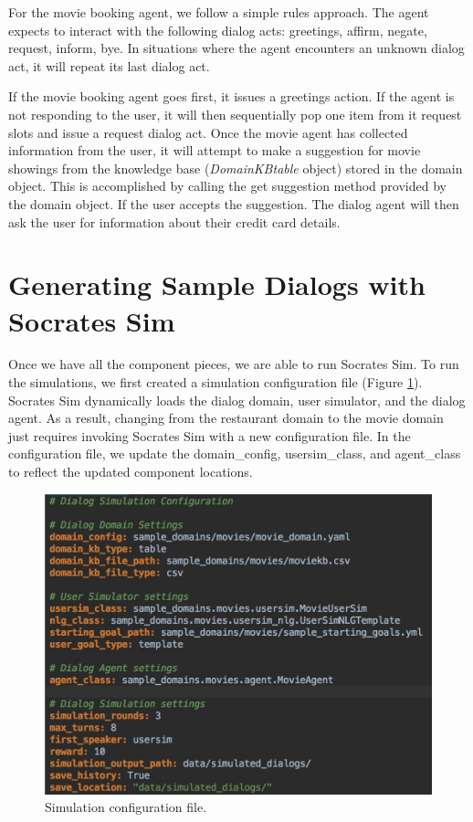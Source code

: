 For the movie booking agent, we follow a simple rules approach. The agent expects to interact with the following dialog acts: greetings, affirm, negate, request, inform, bye. In situations where the agent encounters an unknown dialog act, it will repeat its last dialog act. 

If the movie booking agent goes first, it issues a greetings action. If the agent is not responding to the user, it will then sequentially pop one item from it request slots and issue a request dialog act. Once the movie agent has collected information from the user, it will attempt to make a suggestion for movie showings from the knowledge base (\textit{DomainKBtable} object)  stored in the domain object. This is accomplished by calling the get suggestion method provided by the domain object. If the user accepts the suggestion. The dialog agent will then ask the user for information about their credit card details.

\section{Generating Sample Dialogs with Socrates Sim}

Once we have all the component pieces, we are able to run Socrates Sim. To run the simulations, we first created a simulation configuration file (Figure \ref{fig:movie_sim_config }). Socrates Sim dynamically loads the dialog domain, user simulator, and the dialog agent. As a result, changing from the restaurant domain to the movie domain just requires invoking Socrates Sim with a new configuration file. In the configuration file, we update the domain\_config, usersim\_class, and agent\_class to reflect the updated component locations. 

\begin{figure}[h!]
	\centering
	\includegraphics[scale=.3]{diagrams/movie_sim_config.jpeg}
	\caption{ Simulation configuration file. }
	\label{fig:movie_sim_config }
\end{figure}

